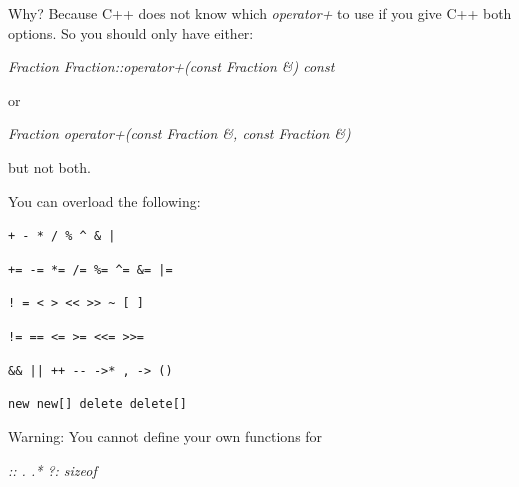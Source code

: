 Why? Because C++ does not know which \textit{operator+} to use if you give
C++ both options. So you should only have either:

\textit{Fraction Fraction::operator+(const Fraction \&) const}

or

\textit{Fraction operator+(const Fraction \&, const Fraction \&)}

but not both.

You can overload the following:

\texttt{+ - * / \% \^{} \& |}

\texttt{+= -= *= /= \%= \^{}= \&= |=}

\texttt{! = < > << >> \~{} [ ]}

\texttt{!= == <= >= <<= >>=}

\texttt{\&\& || ++ -{}- ->* , -> ()}

\texttt{new new[] delete delete[]}

Warning: You cannot define your own functions for

\textit{:: . .* ?: sizeof}


